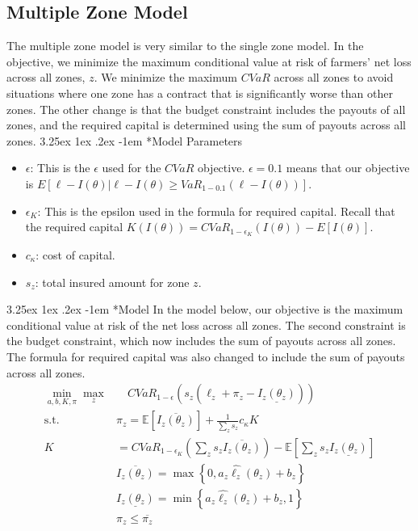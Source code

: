 \documentclass[11pt]{article}
\makeatletter
\renewcommand\paragraph{\@startsection{paragraph}{5}{\z@}%
  {3.25ex \@plus1ex \@minus.2ex}%
  {-1em}%
  {\normalfont\normalsize\bfseries}}
\makeatother
\begin{document}
    \subsection{Multiple Zone Model}
        The multiple zone model is very similar to the single zone model. In the objective, we minimize the maximum conditional value at risk of  farmers' net loss across all zones, $z$. We minimize the maximum $CVaR$ across all zones to avoid situations where one zone has a contract that is significantly worse than other zones. The other change is that the budget constraint includes the payouts of all zones, and the required capital is determined using the sum of payouts across all zones.
      \paragraph*{Model Parameters}
        \begin{itemize}
          \item $\epsilon$: This is the $\epsilon$ used for the $CVaR$ objective.  $\epsilon = 0.1$ means that our objective is $E[\ell - I(\theta)|\ell -I(\theta) \geq VaR_{1-0.1}\left ( \ell - I(\theta) \right )]$.  
          \item $\epsilon_K$: This is the epsilon used in the formula for required capital. Recall that the required capital $K(I(\theta)) = CVaR_{1-\epsilon_K}(I(\theta)) - E[I(\theta)]$. 
          \item $c_{\kappa}$: cost of capital. 
          \item $s_z$: total insured amount for zone $z$.
        \end{itemize}
  
      \paragraph*{Model}
      In the model below, our objective is the maximum conditional value at risk of the net loss across all zones. The second constraint is the budget constraint, which now includes the sum of payouts across all zones. The formula for required capital was also changed to include the sum of payouts across all zones. 
      \begin{align}
        \min_{a,b,K,\pi} \max_z &\quad CVaR_{1-\epsilon}\left (s_z \left (\ell_z  + \pi_z - \underline{I_z(\theta_z)}\right ) \right )\\
        \text{s.t.   } & \pi_z  = \mathbb{E}\left [ \overline{I_z(\theta_z)} \right ] + \frac{1}{\sum_z s_z} c_{\kappa} K \\
        K &= CVaR_{1-\epsilon_K} \left( \sum_z s_z\overline{I_z(\theta_z)} \right ) - \mathbb{E}\left [ \sum_z s_z\underline{I_z(\theta_z)} \right ]\\
        &\overline{I_z(\theta_z)} = \max \left \{0,a_z\hat{\ell_z}(\theta_z) + b_z \right \}\\
        &\underline{I_z(\theta_z)} = \min \left \{a_z\hat{\ell_z}(\theta_z)+b_z,1 \right \}\\
        &\pi_z \leq \overline{\pi_z}
      \end{align}
  
\end{document}
